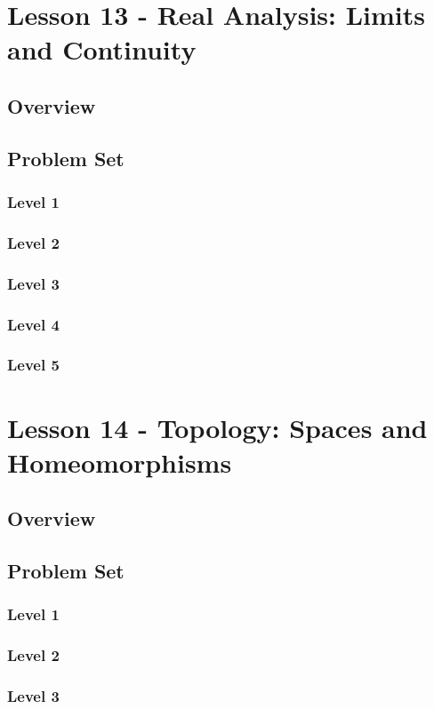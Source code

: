 \documentclass{article}
\begin{document}
\section{Lesson 13 - Real Analysis: Limits and Continuity}
\subsection{Overview}
\subsection{Problem Set}
\subsubsection{Level 1}
\subsubsection{Level 2}
\subsubsection{Level 3}
\subsubsection{Level 4}
\subsubsection{Level 5}
\pagebreak

\section{Lesson 14 - Topology: Spaces and Homeomorphisms}
\subsection{Overview}
\subsection{Problem Set}
\subsubsection{Level 1}
\subsubsection{Level 2}
\subsubsection{Level 3}
\end{document}
